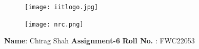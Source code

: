 \documentclass[10pt,a4paper]{report}
\begin{document}
\begin{figure}[!tbp]
  \centering
  \begin{minipage}[b]{0.4\textwidth}
    \texttt{[image: iitlogo.jpg]}
  \end{minipage}
  \hfill
  \vspace{5mm}\begin{minipage}[b]{0.4\textwidth}
\raggedleft  \texttt{[image: nrc.png]}\

  \end{minipage}\vspace{0.2cm}
\end{figure}
\raggedright \textbf{Name}:\hspace{1mm} Chirag Shah\hspace{3cm} \Large \textbf{Assignment-6}\hspace{2.5cm} %
\normalsize \textbf{Roll No.} :\hspace{1mm} FWC22053\vspace{1cm}
\end{document}
